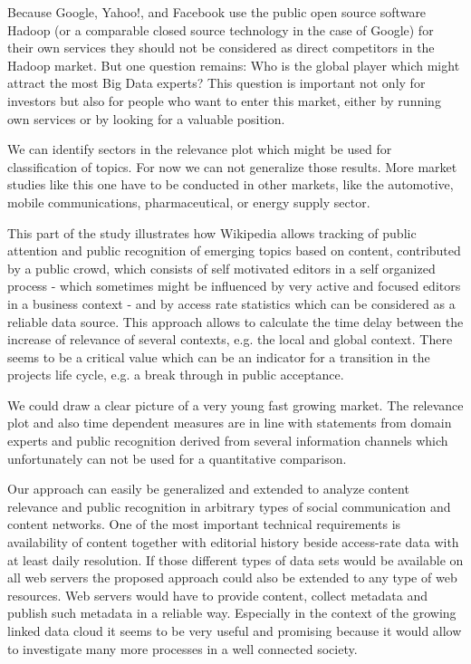 \documentclass[a4paper,10pt]{scrbook}
\begin{document}
\label{ext.fig.MarketTrend}


Because Google, Yahoo!, and Facebook use the public open source software Hadoop (or a comparable closed source technology in the case of Google) for their own services they should not be considered as direct competitors in the Hadoop market. But one question remains: Who is the global player which might attract the most Big Data experts? This question is important not only for investors but also for people who want to enter this market, either by running own services or by looking for a valuable position. 

We can identify sectors in the relevance plot which might be used for classification of topics. For now we can not generalize those results. More market studies like this one have to be conducted in other markets, like the automotive, mobile communications, pharmaceutical, or energy supply sector.

\label{ext.fig.BusinessRelevance} 

%
%

This part of the study illustrates how Wikipedia allows tracking of public attention and public recognition of emerging topics based on content, contributed by a public crowd, which consists of self motivated editors in a self organized process - which sometimes might be influenced by very active and focused editors in a business context - and by access rate statistics which can be considered as a reliable data source. This approach allows to calculate the time delay between the increase of relevance of several contexts, e.g. the local and global context. There seems to be a critical value which can be an indicator for a transition in the projects life cycle, e.g. a break through in public acceptance.

We could draw a clear picture of a very young fast growing market. The relevance plot and also time dependent measures are in line with statements from domain experts and public recognition derived from several information channels which unfortunately can not be used for a quantitative comparison. 

Our approach can easily be generalized and extended to analyze content relevance and public recognition in arbitrary types of social communication and content networks. One of the most important technical requirements is availability of content together with editorial history beside access-rate data with at least daily resolution. If those different types of data sets would be available on all web servers the proposed approach could also be extended to any type of web resources. Web servers would have to provide content, collect metadata and publish such metadata in a reliable way. Especially in the context of the growing linked data cloud it seems to be very useful and promising because it would allow to investigate many more processes in a well connected society. 
\end{document}
